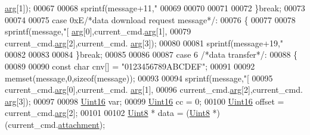 \begin{DoxyCode}
{      \hyperlink{a00004_a56e6c2d7315d0ae60a51e8b140c9cfe4}{arg}[1]);
00067 
00068        sprintf(message+11,\textcolor{stringliteral}{"%
00069 
00070 
00071 
00072        \}\textcolor{keywordflow}{break};
00073        
00074        
00075        \textcolor{keywordflow}{case} 0xE\textcolor{comment}{/*data download request message*/}:
00076        \{
00077     
00078        sprintf(message,\textcolor{stringliteral}{"[%
      \hyperlink{a00004_a56e6c2d7315d0ae60a51e8b140c9cfe4}{arg}[0],current\_cmd.\hyperlink{a00004_a56e6c2d7315d0ae60a51e8b140c9cfe4}{arg}[1],
00079                                                  current\_cmd.\hyperlink{a00004_a56e6c2d7315d0ae60a51e8b140c9cfe4}{arg}[2],current\_cmd.
      \hyperlink{a00004_a56e6c2d7315d0ae60a51e8b140c9cfe4}{arg}[3]);
00080     
00081        sprintf(message+19,\textcolor{stringliteral}{"%
00082 
00083     
00084        \}\textcolor{keywordflow}{break};
00085 
00086 
00087        \textcolor{keywordflow}{case} 6 \textcolor{comment}{/*data transfer*/}:
00088        \{
00089 
00090        \textcolor{keyword}{const} \textcolor{keywordtype}{char} cnv[] = \textcolor{stringliteral}{"0123456789ABCDEF"};
00091 
00092        memset(message,0,\textcolor{keyword}{sizeof}(message));
00093 
00094        sprintf(message,\textcolor{stringliteral}{"[%
00095                                             current\_cmd.\hyperlink{a00004_a56e6c2d7315d0ae60a51e8b140c9cfe4}{arg}[0],current\_cmd.
      \hyperlink{a00004_a56e6c2d7315d0ae60a51e8b140c9cfe4}{arg}[1],
00096                                             current\_cmd.\hyperlink{a00004_a56e6c2d7315d0ae60a51e8b140c9cfe4}{arg}[2],current\_cmd.
      \hyperlink{a00004_a56e6c2d7315d0ae60a51e8b140c9cfe4}{arg}[3]);
00097 
00098        \hyperlink{a00004_aae7407b021d43f7193a81a58cfb3e297}{Uint16} var;
00099        \hyperlink{a00004_aae7407b021d43f7193a81a58cfb3e297}{Uint16} cc = 0;
00100        \hyperlink{a00004_aae7407b021d43f7193a81a58cfb3e297}{Uint16} offset = current\_cmd.\hyperlink{a00004_a56e6c2d7315d0ae60a51e8b140c9cfe4}{arg}[2];
00101 
00102        \hyperlink{a00004_a979e3e23b9a449e69ab6a8a83b6042f8}{Uint8} * data = (\hyperlink{a00004_a979e3e23b9a449e69ab6a8a83b6042f8}{Uint8} *)(current\_cmd.\hyperlink{a00004_a0b844fe783d7e252159a9641b949e83c}{attachment});
}}}}}
\end{DoxyCode}
